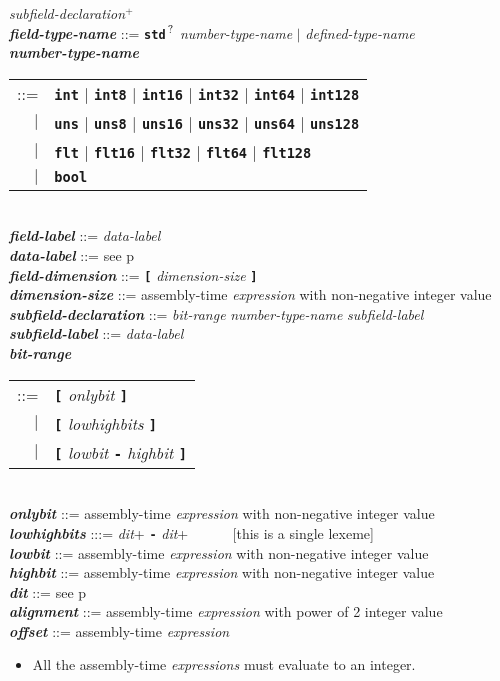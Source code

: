 \documentclass[12pt]{article}
\newcommand{\TT}[1]{{\tt \bfseries #1}}
\newcommand{\PLUS}[1][]{{$^{+#1}$}}
\newcommand{\QMARK}{{$^{\,\mbox{\footnotesize ?}}$}}
\newcommand{\ttkey}[1]{{\tt \bfseries #1}}
\newcommand{\emkey}[1]{{\em \bfseries #1}}
\newcommand{\pagref}[1]{p\pageref{#1}}
\newenvironment{indpar}[1][0.3in]%
	{\begin{list}{}%
		     {\setlength{\itemsep}{0in}%
		      \setlength{\topsep}{0in}%
		      \setlength{\parsep}{1ex}%
		      \setlength{\labelwidth}{#1}%
		      \setlength{\leftmargin}{#1}%
		      \addtolength{\leftmargin}{\labelsep}}%
	 \item}%
	{\end{list}}
\begin{document}
\begin{indpar}
\hspace*{0.5in}
    {\em subfield-declaration}\PLUS{}
\\[2ex]
\emkey{field-type-name} ::= \TT{std}\QMARK{} {\em number-type-name}
                        $|$ {\em defined-type-name} \\
\emkey{number-type-name}
    \begin{tabular}[t]{@{}rl}
    ::= &  \ttkey{int} $|$ \ttkey{int8} $|$ \ttkey{int16} $|$ \ttkey{int32}
                       $|$ \ttkey{int64} $|$ \ttkey{int128} \\
    $|$ &  \ttkey{uns} $|$ \ttkey{uns8} $|$ \ttkey{uns16} $|$ \ttkey{uns32}
                       $|$ \ttkey{uns64} $|$ \ttkey{uns128} \\
    $|$ &  \ttkey{flt} $|$ \ttkey{flt16} $|$ \ttkey{flt32} $|$ \ttkey{flt64}
                         $|$ \ttkey{flt128} \\
    $|$ &  \ttkey{bool}
    \end{tabular}
\\[2ex]
\emkey{field-label}\label{FIELD-LABEL} ::=  {\em data-label} \\
\emkey{data-label} ::=  see \pagref{DATA-LABEL}
\\[2ex]
\emkey{field-dimension} ::=  \TT{[} {\em dimension-size} \TT{]} \\
\emkey{dimension-size} ::=  assembly-time {\em expression}
			    with non-negative integer value
\\[2ex]
\emkey{subfield-declaration}
    ::= {\em bit-range} {\em number-type-name} {\em subfield-label} \\
\emkey{subfield-label}\label{SUBFIELD-LABEL} ::=  {\em data-label}
\\[2ex]
\emkey{bit-range}
    \begin{tabular}[t]{@{}rl}
    ::= &  \TT{[} {\em onlybit} \TT{]} \\
    $|$ &  \TT{[} {\em lowhighbits} \TT{]} \\
    $|$ &  \TT{[} {\em lowbit} \TT{-} {\em highbit} \TT{]}
    \end{tabular} \\
\emkey{onlybit} ::= assembly-time {\em expression}
		    with non-negative integer value \\
\emkey{lowhighbits} :::= {\em dit}+ \TT{-} {\em dit}+
           ~~~~~ [this is a single lexeme] \\
\emkey{lowbit} ::= assembly-time {\em expression}
		   with non-negative integer value \\
\emkey{highbit} ::= assembly-time {\em expression}
		    with non-negative integer value \\
\emkey{dit} ::= see \pagref{DIT}
\\[2ex]
\emkey{alignment} ::= assembly-time {\em expression}
		      with power of 2 integer value \\
\emkey{offset} ::= assembly-time {\em expression}

\begin{itemize}
\item All the assembly-time {\em expressions} must evaluate to an integer.
\end{itemize}
\end{indpar}
\end{document}
